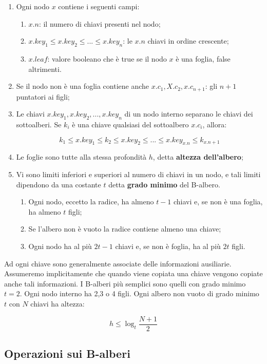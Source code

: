 \begin{enumerate}

\item Ogni nodo $x$ contiene i seguenti campi:
	\begin{enumerate}
	\item $x.n$: il numero di chiavi presenti nel nodo;
	\item $x.key_1\le x.key_2 \le ... \le x.key_n $: le $x.n$ chiavi in ordine crescente;
	\item $x.leaf$: valore booleano che è true se il nodo $x$ è una foglia, false altrimenti.
	\end{enumerate}
\item Se il nodo non è una foglia contiene anche $x.c_1, X.c_2, x.c_{n+1}$: gli $n+1$ puntatori ai figli;
\item Le chiavi $x.key_1, x.key_2, ..., x.key_n$ di un nodo interno separano le chiavi dei sottoalberi. Se $k_i$ è una chiave qualsiasi del sottoalbero $x.c_i$, allora:

$$k_1 \le x.key_1 \le k_2 \le x.key_2 \le ... \le x.key_{x.n} \le k_{x.n+1}$$

\item Le foglie sono tutte alla stessa profondità $h$, detta \textbf{altezza dell'albero};
\item Vi sono limiti inferiori e superiori al numero di chiavi in un nodo, e tali limiti dipendono da una costante $t$ detta \textbf{grado minimo} del B-albero.
	\begin{enumerate}
	\item Ogni nodo, eccetto la radice, ha almeno $t-1$ chiavi e, se non è una foglia, ha almeno $t$ figli;
	\item Se l'albero non è vuoto la radice contiene almeno una chiave;
	\item Ogni nodo ha al più $2t-1$ chiavi e, se non è foglia, ha al più $2t$ figli.
	\end{enumerate}

\end{enumerate}

Ad ogni chiave sono generalmente associate delle informazioni ausiliarie. Assumeremo implicitamente che quando viene copiata una chiave vengono copiate anche tali informazioni. I B-alberi più semplici sono quelli con grado minimo $t=2$. Ogni nodo interno ha 2,3 o 4 figli.
Ogni albero non vuoto di grado minimo $t$ con $N$ chiavi ha altezza:

$$h \le \log_t\frac{N+1}{2}$$

\subsection{Operazioni sui B-alberi}

